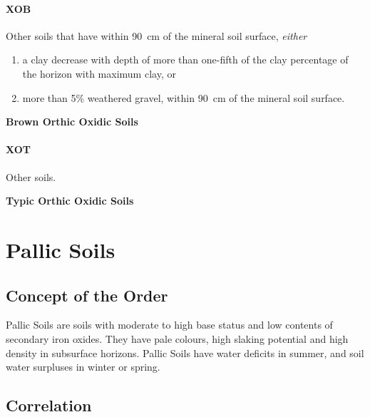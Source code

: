 \documentclass[
  letterpaper,
  DIV=11,
  numbers=noendperiod]{scrreprt}
\providecommand{\tightlist}{%
  \setlength{\itemsep}{0pt}\setlength{\parskip}{0pt}}\usepackage{longtable,booktabs,array}
\begin{document}
\hypertarget{sec-key-XOB}{%
\subsubsection{\texorpdfstring{\textbf{XOB}}{XOB}}\label{sec-key-XOB}}

Other soils that have within 90~cm of the mineral soil surface,
\emph{either}

\begin{enumerate}
\def\labelenumi{\arabic{enumi}.}
\tightlist
\item
  a clay decrease with depth of more than one-fifth of the clay
  percentage of the horizon with maximum clay, or
\item
  more than 5\% weathered gravel, within 90~cm of the mineral soil
  surface.
\end{enumerate}

\textbf{Brown Orthic Oxidic Soils}

\hypertarget{sec-key-XOT}{%
\subsubsection{\texorpdfstring{\textbf{XOT}}{XOT}}\label{sec-key-XOT}}

Other soils.

\textbf{Typic Orthic Oxidic Soils}


\hypertarget{sec-ord-P}{%
\chapter{Pallic Soils}\label{sec-ord-P}}

\hypertarget{sec-con-P}{%
\section{Concept of the Order}\label{sec-con-P}}

Pallic Soils are soils with moderate to high base status and low
contents of secondary iron oxides. They have pale colours, high slaking
potential and high density in subsurface horizons. Pallic Soils have
water deficits in summer, and soil water surpluses in winter or spring.

\hypertarget{sec-cor-P}{%
\section{Correlation}\label{sec-cor-P}}
\end{document}
